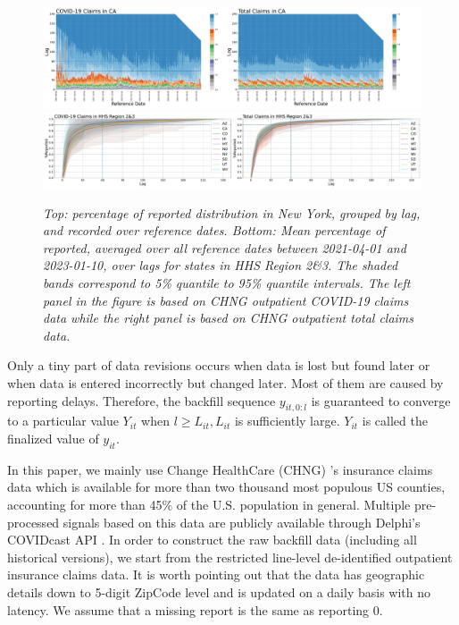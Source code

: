 \begin{figure}
    \centering
    \includegraphics[width=\textwidth]{figs/completeness_CA.pdf}
    \includegraphics[width=\textwidth]{figs/completeness_lineplot_hhs8&9.pdf}
    \caption{\textit{Top: percentage of reported distribution in New York, grouped by lag, and recorded over reference dates. Bottom: Mean percentage of reported, averaged over all reference dates between 2021-04-01 and 2023-01-10, over lags for states in HHS Region 2\&3. The shaded bands correspond to 5\% quantile to 95\% quantile intervals. The left panel in the figure is based on CHNG outpatient COVID-19 claims data while the right panel is based on CHNG outpatient total claims data.}}
\end{figure}

Only a tiny part of data revisions occurs when data is lost but found later or when data is entered incorrectly but changed later. Most of them are caused by reporting delays. Therefore, the backfill sequence $y_{it,0:l}$ is guaranteed to converge to a particular value $Y_{it}$ when $l \geq L_{it}, L_{it}$ is sufficiently large. $Y_{it}$ is called the finalized value of $y_{it}$.

In this paper, we mainly use Change HealthCare (CHNG) 's insurance claims data which is available for more than two thousand most populous US counties, accounting for more than 45\% of the U.S. population in general. Multiple pre-processed signals based on this data are publicly available through Delphi's COVIDcast API \cite{reinhart2021open}. In order to construct the raw backfill data (including all historical versions), we start from the restricted line-level de-identified outpatient insurance claims data. It is worth pointing out that the data has geographic details down to 5-digit ZipCode level and is updated on a daily basis with no latency. We assume that a missing report is the same as reporting 0.

